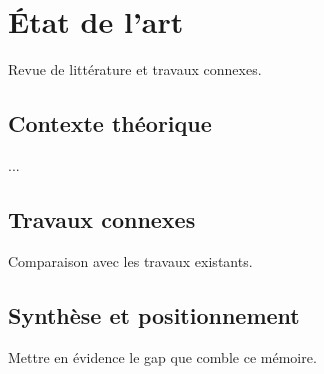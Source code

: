 \chapter{État de l'art}
\label{chap:etat-art}

Revue de littérature et travaux connexes.

\cite{exemple2024}

\section{Contexte théorique}
...

\section{Travaux connexes}
Comparaison avec les travaux existants.

\section{Synthèse et positionnement}
Mettre en évidence le gap que comble ce mémoire.